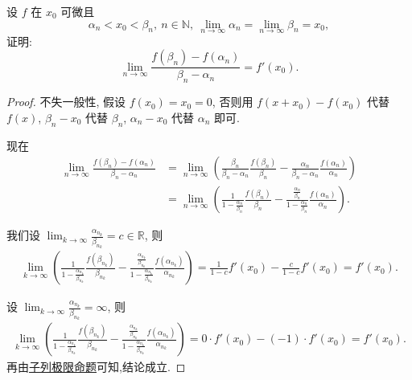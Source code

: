 \documentclass[../../main.tex]{subfiles}%
\begin{document}
\begin{example}
设 $f$ 在 $x_0$ 可微且
$$
\alpha_n < x_0 < \beta_n,\ n\in\mathbb{N},\ \lim_{n\to\infty}\alpha_n = \lim_{n\to\infty}\beta_n = x_0,
$$
证明:
$$
\lim_{n\to\infty}\frac{f(\beta_n)-f(\alpha_n)}{\beta_n-\alpha_n}=f'(x_0).
$$
\end{example}
\begin{proof}

不失一般性, 假设 $f(x_0)=x_0=0$, 否则用 $f(x+x_0)-f(x_0)$ 代替 $f(x)$, $\beta_n-x_0$ 代替 $\beta_n$, $\alpha_n-x_0$ 代替 $\alpha_n$ 即可.

现在
\begin{align*}
\lim_{n\to\infty}\frac{f(\beta_n)-f(\alpha_n)}{\beta_n-\alpha_n}
&= \lim_{n\to\infty}\left(\frac{\beta_n}{\beta_n-\alpha_n}\frac{f(\beta_n)}{\beta_n}-\frac{\alpha_n}{\beta_n-\alpha_n}\frac{f(\alpha_n)}{\alpha_n}\right) \\
&= \lim_{n\to\infty}\left(\frac{1}{1-\frac{\alpha_n}{\beta_n}}\frac{f(\beta_n)}{\beta_n}-\frac{\frac{\alpha_n}{\beta_n}}{1-\frac{\alpha_n}{\beta_n}}\frac{f(\alpha_n)}{\alpha_n}\right).
\end{align*}

我们设 $\lim_{k\to\infty}\frac{\alpha_{n_k}}{\beta_{n_k}}=c\in\mathbb{R}$, 则
\begin{align*}
\lim_{k\to\infty}\left(\frac{1}{1-\frac{\alpha_{n_k}}{\beta_{n_k}}}\frac{f(\beta_{n_k})}{\beta_{n_k}}-\frac{\frac{\alpha_{n_k}}{\beta_{n_k}}}{1-\frac{\alpha_{n_k}}{\beta_{n_k}}}\frac{f(\alpha_{n_k})}{\alpha_{n_k}}\right)
= \frac{1}{1-c}f'(x_0)-\frac{c}{1-c}f'(x_0)=f'(x_0).
\end{align*}

设 $\lim_{k\to\infty}\frac{\alpha_{n_k}}{\beta_{n_k}}=\infty$, 则
\begin{align*}
\lim_{k\to\infty}\left(\frac{1}{1-\frac{\alpha_{n_k}}{\beta_{n_k}}}\frac{f(\beta_{n_k})}{\beta_{n_k}}-\frac{\frac{\alpha_{n_k}}{\beta_{n_k}}}{1-\frac{\alpha_{n_k}}{\beta_{n_k}}}\frac{f(\alpha_{n_k})}{\alpha_{n_k}}\right)
= 0\cdot f'(x_0)-(-1)\cdot f'(x_0)=f'(x_0).
\end{align*}
再由\hyperref[proposition:子列极限命题]{子列极限命题}可知,结论成立.

\end{proof}
\end{document}
